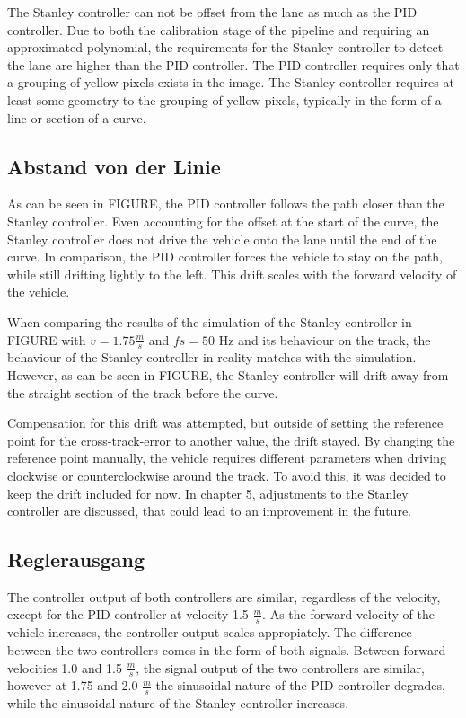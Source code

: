\documentclass[arbeit=studie,oneside,BCOR=12mm]{ArbeitRST}
\begin{document}
The Stanley controller can not be offset from the lane as much as the PID
controller. Due to both the calibration stage of the pipeline and requiring an
approximated polynomial, the requirements for the Stanley controller to detect
the lane are higher than the PID controller. The PID controller requires only
that a grouping of yellow pixels exists in the image. The Stanley controller
requires at least some geometry to the grouping of yellow pixels, typically in
the form of a line or section of a curve.

\subsection{Abstand von der Linie}

As can be seen in FIGURE, the PID controller follows the path closer than the
Stanley controller. Even accounting for the offset at the start of the curve,
the Stanley controller does not drive the vehicle onto the lane until the end
of the curve. In comparison, the PID controller forces the vehicle to stay on
the path, while still drifting lightly to the left. This drift scales with the
forward velocity of the vehicle.

When comparing the results of the simulation of the Stanley controller in
FIGURE with $v = 1.75 \frac{m}{s}$ and $fs = 50$ Hz and its behaviour on the
track, the behaviour of the Stanley controller in reality matches with the
simulation. However, as can be seen in FIGURE, the Stanley controller will
drift away from the straight section of the track before the curve. 

Compensation for this drift was attempted, but outside of setting the reference
point for the cross-track-error to another value, the drift stayed. By changing
the reference point manually, the vehicle requires different parameters when
driving clockwise or counterclockwise around the track. To avoid this, it was
decided to keep the drift included for now. In chapter 5, adjustments to the
Stanley controller are discussed, that could lead to an improvement in the
future.


\subsection{Reglerausgang}

The controller output of both controllers are similar, regardless of the
velocity, except for the PID controller at velocity 1.5 $\frac{m}{s}$. As the
forward velocity of the vehicle increases, the controller output scales
appropiately. The difference between the two controllers comes in the form of
both signals. Between forward velocities 1.0 and 1.5 $\frac{m}{s}$, the signal
output of the two controllers are similar, however at 1.75 and 2.0
$\frac{m}{s}$ the sinusoidal nature of the PID controller degrades, while the
sinusoidal nature of the Stanley controller increases. 
\end{document}
